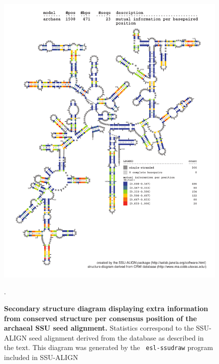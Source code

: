 \begin{figure}
\begin{center}
\includegraphics[width=5.7in]{Figures/archaea-0p1-mutinfo}
\end{center}
\caption[Secondary structure diagram displaying extra information 
  from conserved structure per consensus position of the archaeal SSU seed
  alignment]{\textbf{Secondary structure diagram displaying extra
  information from conserved structure per consensus position of the archaeal SSU seed
  alignment.} Statistics correspond to the SSU-ALIGN seed
  alignment derived from the  database \cite{CannoneGutell02}
  as described in the text. This diagram was generated by the {\tt
  esl-ssudraw} program included in SSU-ALIGN}.
\label{fig:arcsinfo}
\end{figure}


